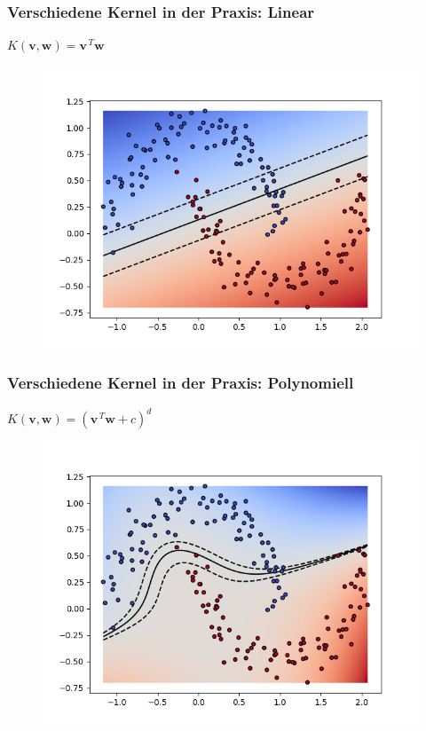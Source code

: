 	\begin{frame}
		\frametitle{Verschiedene Kernel in der Praxis: Linear}
			\vspace{10pt}
			$K(\boldsymbol{v}, \boldsymbol{w}) = \boldsymbol{v}^{\, T} \boldsymbol{w}$
			\begin{figure}
				\includegraphics[width=.9\textwidth]{img/kernelLin.png}
			\end{figure}
	\end{frame}
	
	\begin{frame}
		\frametitle{Verschiedene Kernel in der Praxis: Polynomiell}
			\vspace{10pt}
			$K(\boldsymbol{v}, \boldsymbol{w}) = (\boldsymbol{v}^{\, T} \boldsymbol{w} + c)^{d}$
			\begin{figure}
				\includegraphics[width=.9\textwidth]{img/kernelPol.png}
			\end{figure}
	\end{frame}
	
